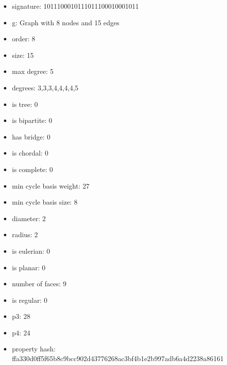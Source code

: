 \begin{itemize}
\item signature: 1011100010111011100010001011
\item g: Graph with 8 nodes and 15 edges
\item order: 8
\item size: 15
\item max degree: 5
\item degrees: 3,3,3,4,4,4,4,5
\item is tree: 0
\item is bipartite: 0
\item has bridge: 0
\item is chordal: 0
\item is complete: 0
\item min cycle basis weight: 27
\item min cycle basis size: 8
\item diameter: 2
\item radius: 2
\item is eulerian: 0
\item is planar: 0
\item number of faces: 9
\item is regular: 0
\item p3: 28
\item p4: 24
\item property hash: ffa330d0ff5f65b8c9bcc902d43776268ac3bf4b1e2b997adb6a4d2238a86161
\end{itemize}
\newpage
\begin{figure}
\end{figure}
